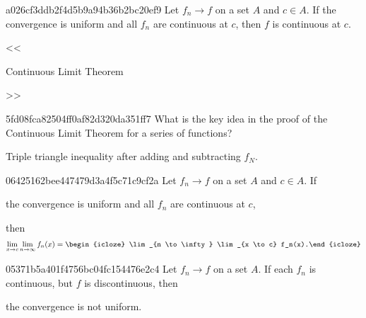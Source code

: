 \begin{note}{a026cf3ddb2f4d5b9a94b36b2bc20ef9}
    Let \({ f_n \to f }\) on a set \({ A }\) and \({ c \in A }\).
    If the convergence is uniform and all \({ f_n }\) are continuous at \({ c }\), then \({ f }\) is continuous at \({ c }\).

    \begin{center}
        \tiny
        <<\begin{icloze}{1}Continuous Limit Theorem\end{icloze}>>
    \end{center}
\end{note}

\begin{note}{5fd08fca82504ff0af82d320da351ff7}
    What is the key idea in the proof of the Continuous Limit Theorem for a series of functions?

    \begin{cloze}{1}
        Triple triangle inequality after adding and subtracting \({ f_N }\).
    \end{cloze}
\end{note}

\begin{note}{06425162bee447479d3a4f5c71c9cf2a}
    Let \({ f_n \to f }\) on a set \({ A }\) and \({ c \in A }\).
    If \begin{icloze}{1}the convergence is uniform and all \({ f_n }\) are continuous at \({ c }\),\end{icloze} then
    \[
        \lim_{x \to c} \lim_{n \to \infty} f_n(x) = \begin{icloze}{2}\lim_{n \to \infty} \lim_{x \to c} f_n(x).\end{icloze}
    \]
\end{note}

\begin{note}{05371b5a401f4756bc04fc154476e2c4}
    Let \({ f_n \to f }\) on a set \({ A }\).
    If each \({ f_n }\) is continuous, but \({ f }\) is discontinuous, then \begin{icloze}{1}the convergence is not uniform.\end{icloze}
\end{note}


